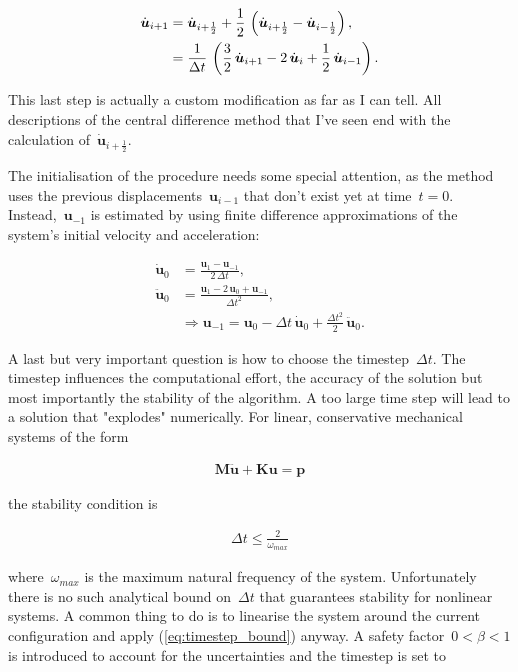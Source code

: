 \begin{align}
\dot{\boldsymbol{u}}_{i+1} &= \dot{\boldsymbol{u}}_{i+\frac{1}{2}} + \frac{1}{2}\,\left(\dot{\boldsymbol{u}}_{i+\frac{1}{2}} - \dot{\boldsymbol{u}}_{i-\frac{1}{2}}\right),\notag\\
&= \frac{1}{\Delta t}\,\left(\frac{3}{2}\,\dot{\boldsymbol{u}}_{i+1} - 2\,\dot{\boldsymbol{u}}_{i} + \frac{1}{2}\,\dot{\boldsymbol{u}}_{i-1}\right).
\end{align}

This last step is actually a custom modification as far as I can tell.
All descriptions of the central difference method that I've seen end with the calculation of~$\dot{\boldsymbol{u}}_{i+\frac{1}{2}}$.

The initialisation of the procedure needs some special attention, as the method uses the previous displacements~$\boldsymbol{u}_{i-1}$ that don't exist yet at time~$t = 0$.
Instead,~$\boldsymbol{u}_{-1}$ is estimated by using finite difference approximations of the system's initial velocity and acceleration:

\begin{align}
\dot{\boldsymbol{u}}_0 &= \frac{\boldsymbol{u}_{1} - \boldsymbol{u}_{-1}}{2\,\Delta t},\\
\ddot{\boldsymbol{u}}_0 &= \frac{\boldsymbol{u}_{1} - 2\,\boldsymbol{u}_{0} + \boldsymbol{u}_{-1}}{\Delta t^2},\\
&\Rightarrow \boldsymbol{u}_{-1} = \boldsymbol{u}_{0} - \Delta t\,\dot{\boldsymbol{u}}_{0} + \frac{\Delta t^2}{2}\,\ddot{\boldsymbol{u}}_{0}.
\end{align}

A last but very important question is how to choose the timestep~$\Delta t$.
The timestep influences the computational effort, the accuracy of the solution but most importantly the stability of the algorithm.
A too large time step will lead to a solution that "explodes" numerically.
For linear, conservative mechanical systems of the form

\begin{align}
\boldsymbol{M}\ddot{\boldsymbol{u}} + \boldsymbol{K}\boldsymbol{u} = \boldsymbol{p}
\end{align}

the stability condition is

\begin{align}
\Delta t \le \frac{2}{\omega_{max}}\label{eq:timestep_bound}
\end{align}

where~$\omega_{max}$ is the maximum natural frequency \cite{bib:dynamic_solution} of the system.
Unfortunately there is no such analytical bound on~$\Delta t$ that guarantees stability for nonlinear systems.
A common thing to do is to linearise the system around the current configuration and apply (\ref{eq:timestep_bound}) anyway.
A safety factor~$0 < \beta < 1$ is introduced to account for the uncertainties and the timestep is set to

